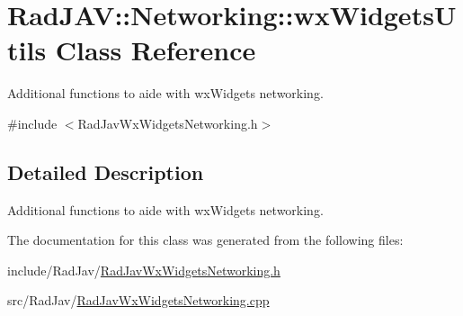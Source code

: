 \hypertarget{class_rad_j_a_v_1_1_networking_1_1wx_widgets_utils}{}\section{Rad\+J\+AV\+:\+:Networking\+:\+:wx\+Widgets\+Utils Class Reference}
\label{class_rad_j_a_v_1_1_networking_1_1wx_widgets_utils}


Additional functions to aide with wx\+Widgets networking.  




{\ttfamily \#include $<$Rad\+Jav\+Wx\+Widgets\+Networking.\+h$>$}



\subsection{Detailed Description}
Additional functions to aide with wx\+Widgets networking. 

The documentation for this class was generated from the following files\+:\begin{DoxyCompactItemize}
\item 
include/\+Rad\+Jav/\mbox{\hyperlink{_rad_jav_wx_widgets_networking_8h}{Rad\+Jav\+Wx\+Widgets\+Networking.\+h}}\item 
src/\+Rad\+Jav/\mbox{\hyperlink{_rad_jav_wx_widgets_networking_8cpp}{Rad\+Jav\+Wx\+Widgets\+Networking.\+cpp}}\end{DoxyCompactItemize}
